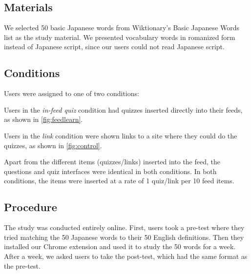 \documentclass{sigchi}
\begin{document}
\subsection{Materials}

We selected 50 basic Japanese words from Wiktionary's Basic Japanese Words list as the study material. We presented vocabulary words in romanized form instead of Japanese script, since our users could not read Japanese script.


\subsection{Conditions}

Users were assigned to one of two conditions:

\begin{compactitem}
\item Users in the \textit{in-feed quiz} condition had quizzes inserted directly into their feeds, as shown in \autoref{fig:feedlearn}.
\item Users in the \textit{link} condition were shown links to a site where they could do the quizzes, as shown in \autoref{fig:control}.
\end{compactitem}

Apart from the different items (quizzes/links) inserted into the feed, the questions and quiz interfaces were identical in both conditions. In both conditions, the items were inserted at a rate of 1 quiz/link per 10 feed items. %


\subsection{Procedure}

The study was conducted entirely online. First, users took a pre-test where they tried matching the 50 Japanese words to their 50 English definitions. Then they installed our Chrome extension and used it to study the 50 words for a week. After a week, we asked users to take the post-test, which had the same format as the pre-test.
\end{document}
